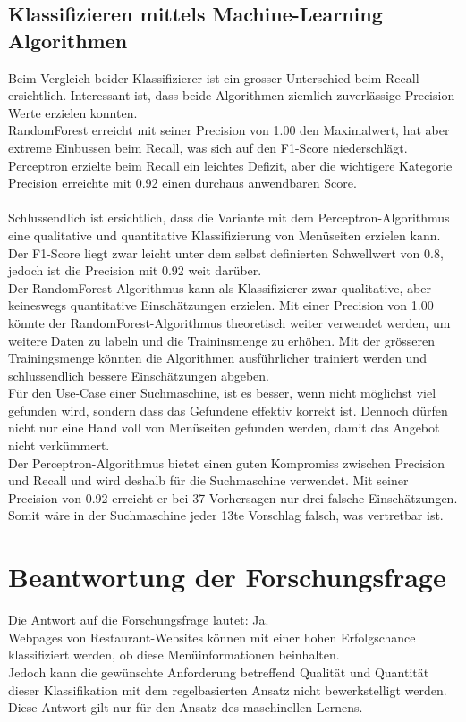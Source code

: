 \subsection{Klassifizieren mittels Machine-Learning Algorithmen}
Beim Vergleich beider Klassifizierer ist ein grosser Unterschied beim Recall ersichtlich.
Interessant ist, dass beide Algorithmen ziemlich zuverlässige Precision-Werte erzielen konnten.\\
RandomForest erreicht mit seiner Precision von 1.00 den Maximalwert, hat aber extreme Einbussen beim Recall, was sich auf den F1-Score niederschlägt.\\
Perceptron erzielte beim Recall ein leichtes Defizit, aber die wichtigere Kategorie Precision erreichte mit 0.92 einen durchaus anwendbaren Score.
\\\\
Schlussendlich ist ersichtlich, dass die Variante mit dem Perceptron-Algorithmus eine qualitative und quantitative Klassifizierung von Menüseiten erzielen kann.
Der F1-Score liegt zwar leicht unter dem selbst definierten Schwellwert von 0.8, jedoch ist die Precision mit 0.92 weit darüber.\\
Der RandomForest-Algorithmus kann als Klassifizierer zwar qualitative, aber keineswegs quantitative Einschätzungen erzielen.
Mit einer Precision von 1.00 könnte der RandomForest-Algorithmus theoretisch weiter verwendet werden, um weitere Daten zu labeln und die Traininsmenge zu erhöhen.
Mit der grösseren Trainingsmenge könnten die Algorithmen ausführlicher trainiert werden und schlussendlich bessere Einschätzungen abgeben.
\\

Für den \glqq Use-Case\grqq{} einer Suchmaschine, ist es besser, wenn nicht möglichst viel gefunden wird, sondern dass das Gefundene effektiv korrekt ist.
Dennoch dürfen nicht nur eine Hand voll von Menüseiten gefunden werden, damit das Angebot nicht verkümmert.\\
Der Perceptron-Algorithmus bietet einen guten Kompromiss zwischen Precision und Recall und wird deshalb für die Suchmaschine verwendet.
Mit seiner Precision von 0.92 erreicht er bei 37 Vorhersagen nur drei falsche Einschätzungen.
Somit wäre in der Suchmaschine jeder 13te Vorschlag falsch, was vertretbar ist.
\section{Beantwortung der Forschungsfrage}
Die Antwort auf die Forschungsfrage lautet: Ja.\\ Webpages von Restaurant-Websites können mit einer hohen Erfolgschance klassifiziert werden, ob diese Menüinformationen beinhalten.\\
Jedoch kann die gewünschte Anforderung betreffend Qualität und Quantität dieser Klassifikation mit dem regelbasierten Ansatz nicht bewerkstelligt werden.
Diese Antwort gilt nur für den Ansatz des maschinellen Lernens.
